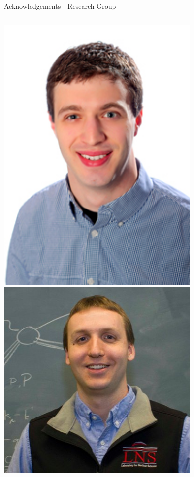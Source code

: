 \documentclass[aspectratio=169]{beamer}
\begin{document}
\begin{frame}{Acknowledgements - Research Group}
    \begin{columns}
            \includegraphics[width=0.75\textwidth]{people/actual_mrg/charles.png}
            \includegraphics[width=0.75\textwidth]{people/actual_mrg/axel.png}
            

\end{columns}
\end{frame}
\end{document}
